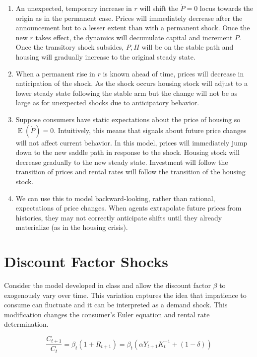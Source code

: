 \documentclass[11pt]{article}
\DeclareMathOperator{\ev}{E}
\begin{document}
\begin{enumerate}
        \item An unexpected, temporary increase in $r$ will shift the $\dot P = 0$ locus towards the origin as in the permanent case. Prices will immediately decrease after the announcement but to a lesser extent than with a permanent shock. Once the new $r$ takes effect, the dynamics will decumulate capital and increment $P$. Once the transitory shock subsides, $P, H$ will be on the stable path and housing will gradually increase to the original steady state.

        \item When a permanent rise in $r$ is known ahead of time, prices will decrease in anticipation of the shock. As the shock occurs housing stock will adjust to a lower steady state following the stable arm but the change will not be as large as for unexpected shocks due to anticipatory behavior.

        \item Suppose consumers have static expectations about the price of housing so $\ev(\dot P) = 0$. Intuitively, this means that signals about future price changes will not affect current behavior. In this model, prices will immediately jump down to the new saddle path in response to the shock. Housing stock will decrease gradually to the new steady state. Investment will follow the transition of prices and rental rates will follow the transition of the housing stock.

        \item We can use this to model backward-looking, rather than rational, expectations of price changes. When agents extrapolate future prices from histories, they may not correctly anticipate shifts until they already materialize (as in the housing crisis).

    \end{enumerate}

\section{Discount Factor Shocks}

    Consider the model developed in class and allow the discount factor $\beta$ to exogenously vary over time. This variation captures the idea that impatience to consume can fluctuate and it can be interpreted as a demand shock. This modification changes the consumer's Euler equation and rental rate determination.

        $$ \frac{C_{t+1}}{C_t} = \beta_t (1 + R_{t+1}) = \beta_t (\alpha Y_{t+1} K_t^{-1} + (1-\delta)) $$
\end{document}
